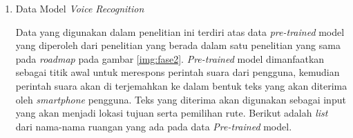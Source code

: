 	\begin{enumerate}
	\item Data Model \textit{Voice Recognition}
	\par Data yang digunakan dalam penelitian ini terdiri atas data \textit{pre-trained} model yang diperoleh dari penelitian yang berada dalam satu penelitian yang sama pada \textit{roadmap} pada gambar \ref{img:fase2}. \textit{Pre-trained} model dimanfaatkan sebagai titik awal untuk merespons perintah suara dari pengguna, kemudian perintah suara akan di terjemahkan ke dalam bentuk teks yang akan diterima oleh \textit{smartphone} pengguna. Teks yang diterima akan digunakan sebagai input yang akan menjadi lokasi tujuan serta pemilihan rute. Berikut adalah \textit{list} dari nama-nama ruangan yang ada pada data \textit{Pre-trained} model.
	

\end{enumerate}
